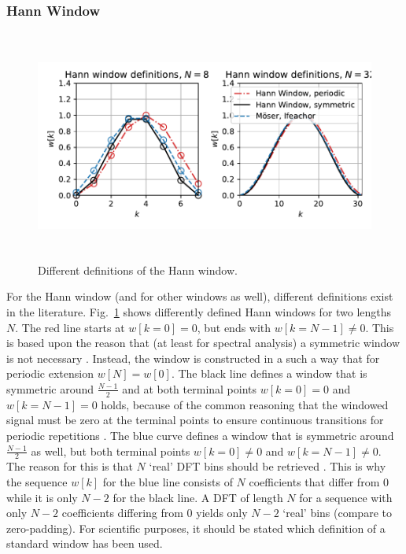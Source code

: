 \documentclass[11pt,a4paper,DIV=12]{scrartcl}
\begin{document}
\subsubsection{Hann Window}
\begin{figure}
		\centering
		\includegraphics[width=6in, height=3in]{graphics/HannDefinitionen.pdf}
		\caption{Different definitions of the Hann window.}
		\label{HannDefinitionen}
\end{figure}

For the Hann window (and for other windows as well), different definitions
exist in the literature.
%
Fig.~\ref{HannDefinitionen} shows differently defined Hann windows for two
lengths $N$.
%
The red line starts at $w[k=0]=0$, but ends with $w[k=N-1]\neq0$.
%
This is based upon the reason that (at least for spectral analysis) a symmetric
window is not necessary \cite[p.~52]{Harris1978}.
%
Instead, the window is constructed in a such a way that for periodic extension
$w[N]=w[0]$.
%
The black line defines a window that is symmetric around $\frac{N-1}{2}$ and at
both terminal points $w[k=0]=0$ and $w[k=N-1]=0$ holds, because of the common
reasoning that the windowed signal must be zero at the terminal points to
ensure continuous transitions for periodic repetitions
\cite{Oppenheim2010, Lyons2011}.
%
The blue curve defines a window that is symmetric around $\frac{N-1}{2}$ as well,
but both terminal points $w[k=0]\neq0$ and $w[k=N-1]\neq0$.
%
The reason for this is that $N$ `real' DFT bins should be retrieved
\cite{Moeser2011, Ifeachor2002}.
%
This is why the sequence $w[k]$ for the blue line consists of $N$ coefficients
that differ from 0 while it is only $N-2$ for the black line.
%
A DFT of length $N$ for a sequence with only $N-2$ coefficients differing from
0 yields only $N-2$ `real' bins (compare to zero-padding).
%
For scientific purposes, it should be stated which definition of a standard
window has been used.
\end{document}
